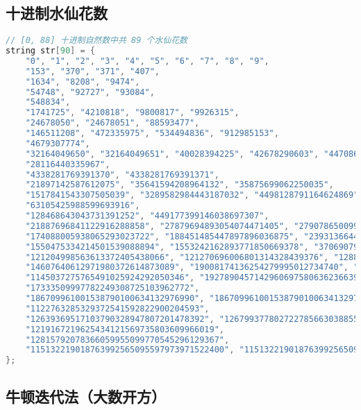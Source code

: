 \subsection{十进制水仙花数}

\begin{lstlisting}[language=C++]
    // [0, 88] 十进制自然数中共 89 个水仙花数
string str[90] = {
    "0", "1", "2", "3", "4", "5", "6", "7", "8", "9",
    "153", "370", "371", "407",
    "1634", "8208", "9474",
    "54748", "92727", "93084",
    "548834",
    "1741725", "4210818", "9800817", "9926315",
    "24678050", "24678051", "88593477",
    "146511208", "472335975", "534494836", "912985153",
    "4679307774",
    "32164049650", "32164049651", "40028394225", "42678290603", "44708635679", "49388550606", "82693916578", "94204591914",
    "28116440335967",
    "4338281769391370", "4338281769391371",
    "21897142587612075", "35641594208964132", "35875699062250035",
    "1517841543307505039", "3289582984443187032", "4498128791164624869", "4929273885928088826",
    "63105425988599693916",
    "128468643043731391252", "449177399146038697307",
    "21887696841122916288858", "27879694893054074471405", "27907865009977052567814", "28361281321319229463398", "35452590104031691935943",
    "174088005938065293023722", "188451485447897896036875", "239313664430041569350093",
    "1550475334214501539088894", "1553242162893771850669378", "3706907995955475988644380", "3706907995955475988644381", "4422095118095899619457938",
    "121204998563613372405438066", "121270696006801314328439376", "128851796696487777842012787", "174650464499531377631639254", "177265453171792792366489765",
    "14607640612971980372614873089", "19008174136254279995012734740", "19008174136254279995012734741", "23866716435523975980390369295",
    "1145037275765491025924292050346", "1927890457142960697580636236639", "2309092682616190307509695338915",
    "17333509997782249308725103962772",
    "186709961001538790100634132976990", "186709961001538790100634132976991",
    "1122763285329372541592822900204593",
    "12639369517103790328947807201478392", "12679937780272278566303885594196922",
    "1219167219625434121569735803609966019",
    "12815792078366059955099770545296129367",
    "115132219018763992565095597973971522400", "115132219018763992565095597973971522401"
};
\end{lstlisting}

\subsection{牛顿迭代法（大数开方）}

